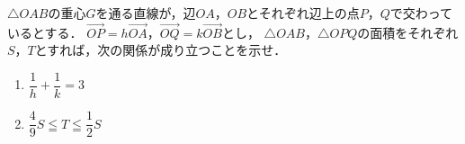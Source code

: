 \documentclass[../../main.tex]{subfiles}
\begin{document}
$\triangle OAB$の重心$G$を通る直線が，辺$OA$，$OB$とそれぞれ辺上の点$P$，$Q$で交わっているとする．
$\overrightarrow{OP}=h\overrightarrow{OA}$，$\overrightarrow{OQ}=k\overrightarrow{OB}$とし，
$\triangle OAB$，$\triangle OPQ$の面積をそれぞれ$S$，$T$とすれば，次の関係が成り立つことを示せ．
\begin{enumerate}
  \item $\displaystyle\dfrac{1}{h}+\dfrac{1}{k}=3$
  \item $\displaystyle\dfrac{4}{9}S\leqq T \leqq\dfrac{1}{2}S$
\end{enumerate}
\end{document}

